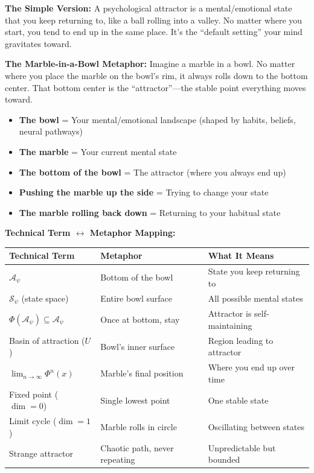 \documentclass[11pt,twoside]{book}
\newcommand{\Frac}{\Phi}
\newcommand{\PsychAttractor}{\mathcal{A}_\psi}
\begin{document}
\begin{tcolorbox}[colback=green!5!white,colframe=green!65!black,title=\textbf{Plain English: What is a Psychological Attractor?},breakable]

\textbf{The Simple Version:}
A psychological attractor is a mental/emotional state that you keep returning to, like a ball rolling into a valley. No matter where you start, you tend to end up in the same place. It's the ``default setting'' your mind gravitates toward.

\textbf{The Marble-in-a-Bowl Metaphor:}
Imagine a marble in a bowl. No matter where you place the marble on the bowl's rim, it always rolls down to the bottom center. That bottom center is the ``attractor''---the stable point everything moves toward.

\begin{itemize}
    \item \textbf{The bowl} = Your mental/emotional landscape (shaped by habits, beliefs, neural pathways)
    \item \textbf{The marble} = Your current mental state
    \item \textbf{The bottom of the bowl} = The attractor (where you always end up)
    \item \textbf{Pushing the marble up the side} = Trying to change your state
    \item \textbf{The marble rolling back down} = Returning to your habitual state
\end{itemize}

\textbf{Technical Term $\leftrightarrow$ Metaphor Mapping:}
\begin{center}
\footnotesize
\begin{tabularx}{\textwidth}{>{\raggedright\arraybackslash}X|>{\raggedright\arraybackslash}X|>{\raggedright\arraybackslash}X}
\toprule
\textbf{Technical Term} & \textbf{Metaphor} & \textbf{What It Means} \\
\midrule
$\PsychAttractor$ & Bottom of the bowl & State you keep returning to \\
$\mathcal{S}_\psi$ (state space) & Entire bowl surface & All possible mental states \\
$\Frac(\PsychAttractor) \subseteq \PsychAttractor$ & Once at bottom, stay & Attractor is self-maintaining \\
Basin of attraction ($U$) & Bowl's inner surface & Region leading to attractor \\
$\lim_{n \to \infty} \Frac^n(x)$ & Marble's final position & Where you end up over time \\
Fixed point ($\dim = 0$) & Single lowest point & One stable state \\
Limit cycle ($\dim = 1$) & Marble rolls in circle & Oscillating between states \\
Strange attractor & Chaotic path, never repeating & Unpredictable but bounded \\
\bottomrule
\end{tabularx}
\end{center}


\end{tcolorbox}
\end{document}
